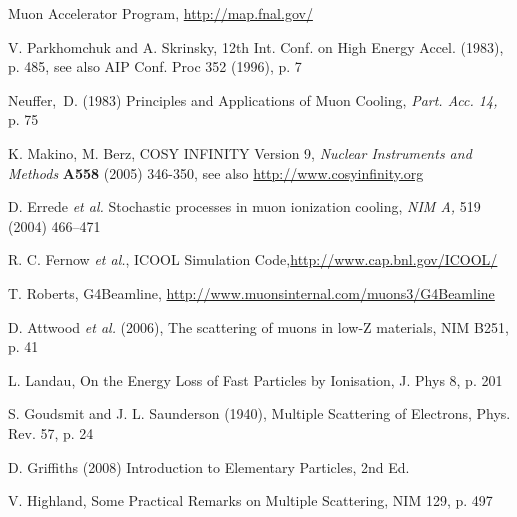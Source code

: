 \documentclass{jacow}
\begin{document}

\begin{thebibliography}{9}

Muon Accelerator Program, \url{http://map.fnal.gov/}

V. Parkhomchuk and A. Skrinsky, 12th Int. Conf. on High Energy Accel. (1983), p. 485, see also AIP Conf. Proc 352 (1996), p. 7 

Neuffer,~D. (1983) Principles and Applications of Muon Cooling, \emph{Part. Acc. 14,} p. 75

K. Makino, M. Berz, COSY INFINITY Version 9, \emph{Nuclear Instruments and Methods} \textbf{A558} (2005) 346-350, see also \url{http://www.cosyinfinity.org}


D. Errede \emph{et al.} Stochastic processes in muon ionization cooling, \emph {NIM A,} 519 (2004) 466--471

R. C. Fernow \emph{et al.}, ICOOL Simulation Code,\url{http://www.cap.bnl.gov/ICOOL/}

T. Roberts, G4Beamline, \url{http://www.muonsinternal.com/muons3/G4Beamline}

D. Attwood \emph{et al.} (2006), The scattering of muons in low-Z materials, NIM B251, p. 41

L. Landau, On the Energy Loss of Fast Particles by Ionisation, J. Phys 8, p. 201

S. Goudsmit and J. L. Saunderson (1940), Multiple Scattering of Electrons, Phys. Rev. 57, p. 24

D. Griffiths (2008) Introduction to Elementary Particles, 2nd Ed. 

V. Highland, Some Practical Remarks on Multiple Scattering, NIM 129, p. 497


\end{thebibliography}
\end{document}
